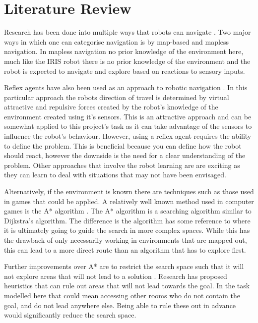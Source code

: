 \section{Literature Review}
Research has been done into multiple ways that robots can navigate \cite{Bonin-Font2008}. Two major ways in which one can categorise navigation is by map-based and mapless navigation. In mapless navigation no prior knowledge of the environment here, much like the IRIS robot there is no prior knowledge of the environment and the robot is expected to navigate and explore based on reactions to sensory inputs.

Reflex agents have also been used as an approach to robotic navigation \cite{Borenstein1989}. In this particular approach the robots direction of travel is determined by virtual attractive and repulsive forces created by the robot's knowledge of the environment created using it's sensors. This is an attractive approach and can be somewhat applied to this project's task as it can take advantage of the sensors to influence the robot's behaviour. However, using a reflex agent requires the ability to define the problem. This is beneficial because you can define how the robot should react, however the downside is the need for a clear understanding of the problem. Other approaches that involve the robot learning are are exciting as they can learn to deal with situations that may not have been envisaged.

Alternatively, if the environment is known there are techniques such as those used in games that could be applied. A relatively well known method used in computer games is the A* algorithm \cite{Cui2011}. The A* algorithm is a searching algorithm similar to Dijkstra's algorithm. The difference is the algorithm has some reference to where it is ultimately going to guide the search in more complex spaces. While this has the drawback of only necessarily working in environments that are mapped out, this can lead to a more direct route than an algorithm that has to explore first.

Further improvements over A* are to restrict the search space such that it will not explore areas that will not lead to a solution \cite{Bjornsson}. Research has proposed heuristics that can rule out areas that will not lead towards the goal. In the task modelled here that could mean accessing other rooms who do not contain the goal, and do not lead anywhere else. Being able to rule these out in advance would significantly reduce the search space.

